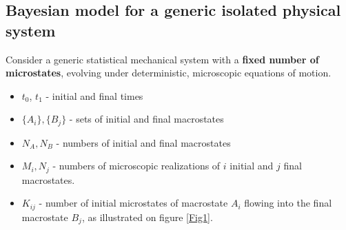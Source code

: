 \documentclass[a0]{sciposter}
\begin{document}
\begin{multicols}{3}



\section{Bayesian model for a generic isolated physical system}
\normalsize
\begin{flushleft}
Consider a generic statistical mechanical system with a \textbf{fixed number of microstates}, evolving under deterministic, microscopic equations of motion. 
\begin{itemize}
	\item $t_0$, $t_1$ - initial and final times
	\item $\{A_i\}, \{B_j\}$ - sets of initial and final macrostates
	\item $N_A, N_B$ - numbers of initial and final macrostates
	\item $M_i, N_j$ - numbers of microscopic realizations of $i$ initial and $j$ final macrostates.
	\item $K_{ij}$ - number of initial microstates of macrostate $A_i$ flowing into the final macrostate $B_j$, as illustrated on figure \ref{Fig1}.
\end{itemize}


\end{flushleft}
\end{multicols}
\end{document}

